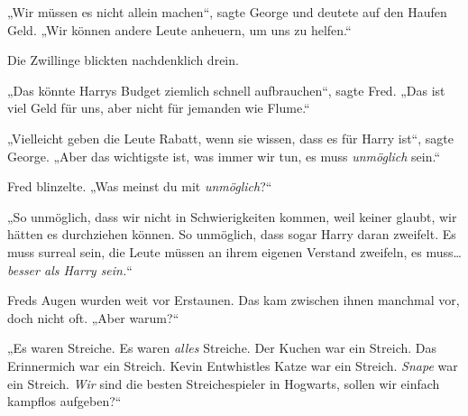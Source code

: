 „Wir müssen es nicht allein machen“, sagte George und deutete auf den Haufen Geld. „Wir können andere Leute anheuern, um uns zu helfen.“

Die Zwillinge blickten nachdenklich drein.

„Das könnte Harrys Budget ziemlich schnell aufbrauchen“, sagte Fred. „Das ist viel Geld für uns, aber nicht für jemanden wie Flume.“

„Vielleicht geben die Leute Rabatt, wenn sie wissen, dass es für Harry ist“, sagte George. „Aber das wichtigste ist, was immer wir tun, es muss \emph{unmöglich} sein.“

Fred blinzelte. „Was meinst du mit \emph{unmöglich}?“

„So unmöglich, dass wir nicht in Schwierigkeiten kommen, weil keiner glaubt, wir hätten es durchziehen können. So unmöglich, dass sogar Harry daran zweifelt. Es muss surreal sein, die Leute müssen an ihrem eigenen Verstand zweifeln, es muss… \emph{besser als Harry sein.}“

Freds Augen wurden weit vor Erstaunen. Das kam zwischen ihnen manchmal vor, doch nicht oft. „Aber warum?“

„Es waren Streiche. Es waren \emph{alles} Streiche. Der Kuchen war ein Streich. Das Erinnermich war ein Streich. Kevin Entwhistles Katze war ein Streich. \emph{Snape} war ein Streich. \emph{Wir} sind die besten Streichespieler in Hogwarts, sollen wir einfach kampflos aufgeben?“

